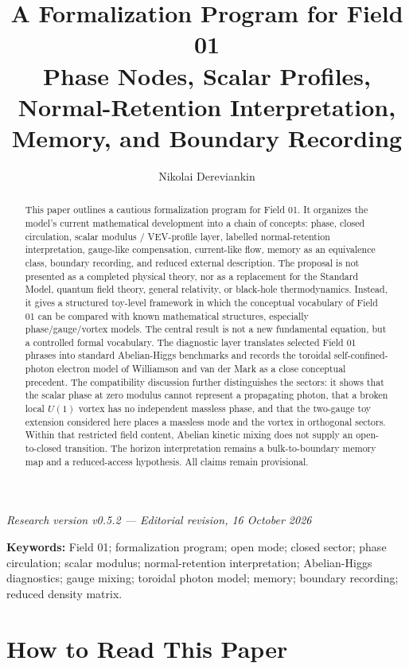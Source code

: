 \documentclass[11pt,a4paper]{article}
\title{A Formalization Program for Field 01\\\large Phase Nodes, Scalar Profiles, Normal-Retention Interpretation, Memory, and Boundary Recording}
\author{Nikolai Dereviankin}
\date{}
\begin{document}
\maketitle

\begin{center}
\textit{Research version v0.5.2 --- Editorial revision, 16 October 2026}
\end{center}

\begin{abstract}
This paper outlines a cautious formalization program for Field 01. It organizes the model's current mathematical development into a chain of concepts: phase, closed circulation, scalar modulus / VEV-profile layer, labelled normal-retention interpretation, gauge-like compensation, current-like flow, memory as an equivalence class, boundary recording, and reduced external description. The proposal is not presented as a completed physical theory, nor as a replacement for the Standard Model, quantum field theory, general relativity, or black-hole thermodynamics. Instead, it gives a structured toy-level framework in which the conceptual vocabulary of Field 01 can be compared with known mathematical structures, especially phase/gauge/vortex models. The central result is not a new fundamental equation, but a controlled formal vocabulary. The diagnostic layer translates selected Field 01 phrases into standard Abelian-Higgs benchmarks and records the toroidal self-confined-photon electron model of Williamson and van der Mark as a close conceptual precedent. The compatibility discussion further distinguishes the sectors: it shows that the scalar phase at zero modulus cannot represent a propagating photon, that a broken local $U(1)$ vortex has no independent massless phase, and that the two-gauge toy extension considered here places a massless mode and the vortex in orthogonal sectors. Within that restricted field content, Abelian kinetic mixing does not supply an open-to-closed transition. The horizon interpretation remains a bulk-to-boundary memory map and a reduced-access hypothesis. All claims remain provisional.
\end{abstract}

\textbf{Keywords:} Field 01; formalization program; open mode; closed sector; phase circulation; scalar modulus; normal-retention interpretation; Abelian-Higgs diagnostics; gauge mixing; toroidal photon model; memory; boundary recording; reduced density matrix.

\section{How to Read This Paper}
\end{document}
